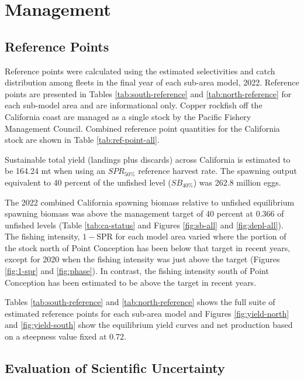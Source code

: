 \documentclass[11pt,
  english,
  letterpaper,
]{article}
\begin{document}
\hypertarget{management}{%
\section{Management}\label{management}}

\hypertarget{reference-points-1}{%
\subsection{Reference Points}\label{reference-points-1}}

Reference points were calculated using the estimated selectivities and catch distribution among fleets in the final year of each sub-area model, 2022. Reference points are presented in Tables \ref{tab:south-reference} and \ref{tab:north-reference} for each sub-model area and are informational only. Copper rockfish off the California coast are managed as a single stock by the Pacific Fishery Management Council. Combined reference point quantities for the California stock are shown in Table \ref{tab:ref-point-all}.

Sustainable total yield (landings plus discards) across California is estimated to be 164.24 mt when using an \(SPR_{50\%}\) reference harvest rate. The spawning output equivalent to 40 percent of the unfished level (\(SB_{40\%}\)) was 262.8 million eggs.

The 2022 combined California spawning biomass relative to unfished equilibrium spawning biomass was above the management target of 40 percent at 0.366 of unfished levels (Table \ref{tab:ca-status} and Figures \ref{fig:sb-all} and \ref{fig:depl-all}). The fishing intensity, \(1-\text{SPR}\) for each model area varied where the portion of the stock north of Point Conception has been below that target in recent years, except for 2020 when the fishing intensity was just above the target (Figures \ref{fig:1-spr} and \ref{fig:phase}). In contrast, the fishing intensity south of Point Conception has been estimated to be above the target in recent years.

Tables \ref{tab:south-reference} and \ref{tab:north-reference} shows the full suite of estimated reference points for each sub-area model and Figures \ref{fig:yield-north} and \ref{fig:yield-south} show the equilibrium yield curves and net production based on a steepness value fixed at 0.72.

\hypertarget{evaluation-of-scientific-uncertainty}{%
\subsection{Evaluation of Scientific Uncertainty}\label{evaluation-of-scientific-uncertainty}}
\end{document}
